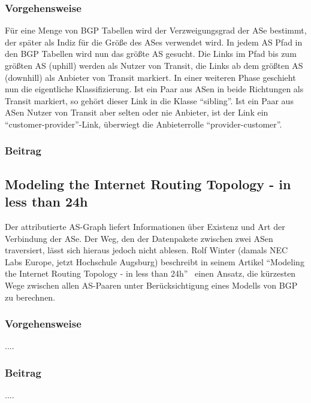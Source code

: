 \subsubsection{Vorgehensweise}
Für eine Menge von BGP Tabellen wird der Verzweigungsgrad der ASe bestimmt, der später als Indiz für die Größe des ASes verwendet wird.
In jedem AS Pfad in den BGP Tabellen wird nun das größte AS gesucht.
Die Links im Pfad bis zum größten AS (uphill) werden als Nutzer von Transit, die Links ab dem größten AS (downhill) als Anbieter von Transit markiert.
In einer weiteren Phase geschieht nun die eigentliche Klassifizierung.
Ist ein Paar aus ASen in beide Richtungen als Transit markiert, so gehört dieser Link in die Klasse "`sibling"'.
Ist ein Paar aus ASen Nutzer von Transit aber selten oder nie Anbieter, ist der Link ein "`customer-provider"'-Link, überwiegt die Anbieterrolle "`provider-customer"'.

\subsubsection{Beitrag}

\subsection{Modeling the Internet Routing Topology - in less than 24h}\label{subsec:winter}
Der attributierte AS-Graph liefert Informationen über Existenz und Art der Verbindung der ASe.
Der Weg, den der Datenpakete zwischen zwei ASen traversiert, lässt sich hieraus jedoch nicht ablesen.
Rolf Winter (damals NEC Labs Europe, jetzt Hochschule Augsburg) beschreibt in seinem Artikel "`Modeling the Internet Routing Topology - in less than 24h"'~\cite{conf/pads/Winter09} einen Ansatz, die kürzesten Wege zwischen allen AS-Paaren unter Berücksichtigung eines Modells von BGP zu berechnen.

\subsubsection{Vorgehensweise}
....


\subsubsection{Beitrag}
....
